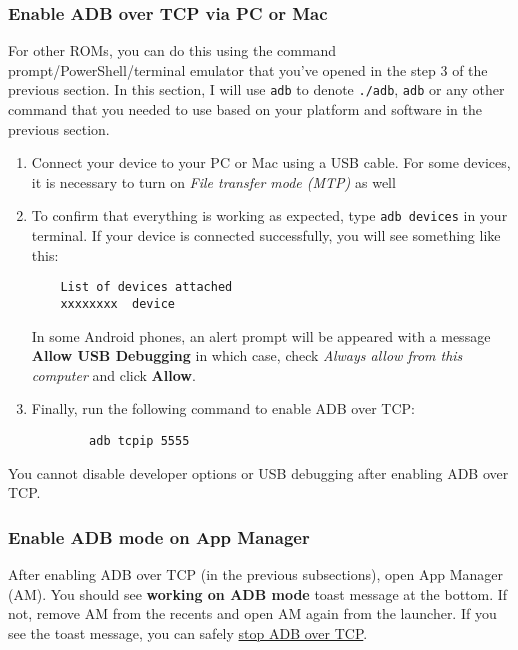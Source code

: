 \subsubsection{Enable ADB over TCP via PC or Mac}\label{subsubsec:enable-adb-over-tcp-via-pc-or-mac}
For other ROMs, you can do this using the command prompt/PowerShell/terminal emulator that you've opened in the step 3
of the previous section. In this section, I will use \texttt{adb} to denote \texttt{./adb}, \texttt{adb} or any other
command that you needed to use based on your platform and software in the previous section.
\begin{enumerate}
    \item Connect your device to your PC or Mac using a USB cable. For some devices, it is necessary to turn on
    \textit{File transfer mode (MTP)} as well
    \item To confirm that everything is working as expected, type \texttt{adb devices} in your terminal. If your device
    is connected successfully, you will see something like this:
    \begin{Verbatim}
    List of devices attached
    xxxxxxxx  device
    \end{Verbatim}
    \begin{tip}[Notice]
        In some Android phones, an alert prompt will be appeared with a message \textbf{Allow USB Debugging}
        in which case, check \textit{Always allow from this computer} and click \textbf{Allow}.
    \end{tip}
    \item Finally, run the following command to enable ADB over TCP:
    \begin{verbatim}
        adb tcpip 5555
    \end{verbatim}
\end{enumerate}

\begin{danger}[Danger]
    You cannot disable developer options or USB debugging after enabling ADB over TCP\@.
\end{danger}

\subsubsection{Enable ADB mode on App Manager}\label{subsubsec:adb-mode-on-app-manager}
After enabling ADB over TCP (in the previous subsections), open App Manager (AM). You should see \textbf{working on ADB
mode} toast message at the bottom. If not, remove AM from the recents and open AM again from the launcher. If you see
the toast message, you can safely \hyperref[subsubsec:stop-adb-over-tcp]{stop ADB over TCP}.

